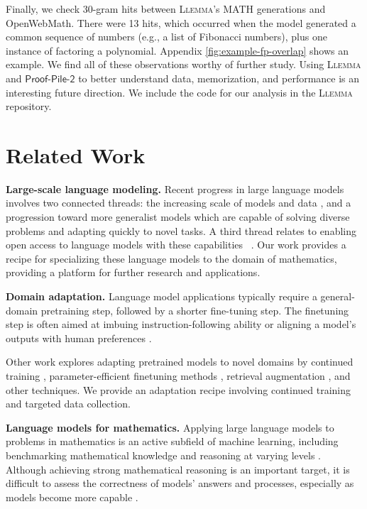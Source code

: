Finally, we check 30-gram hits between \textsc{Llemma}'s MATH generations and OpenWebMath. There were 13 hits, which occurred when the model generated a common sequence of numbers (e.g., a list of Fibonacci numbers), plus one instance of factoring a polynomial. Appendix \autoref{fig:example-fp-overlap} shows an example. We find all of these observations worthy of further study. Using \textsc{Llemma} and $\mathsf{Proof}$-$\mathsf{Pile}$-$\mathsf{2}$ to better understand data, memorization, and performance is an interesting future direction. We include the code for our analysis in the \textsc{Llemma} repository.

\section{Related Work}

\textbf{Large-scale language modeling.} Recent progress in large language models involves two connected threads: the increasing scale of models and data \citep{hoffmann2022training, kaplan2020ScalingLF, chowdhery2022palm}, and a progression toward more generalist models \citep{radford2019language, brown2020gpt3} which are capable of solving diverse problems and adapting quickly to novel tasks. A third thread relates to enabling open access to language models with these capabilities ~\citep{black2022gpt,biderman2023pythia,touvron2023llama,roziere2023code}. Our work provides a recipe for specializing these language models to the domain of mathematics, providing a platform for further research and applications.

\textbf{Domain adaptation.} Language model applications typically require a general-domain pretraining step, followed by a shorter fine-tuning step. The finetuning step is often aimed at imbuing instruction-following ability \citep{sanh2022multitask, wei2022finetuned} or aligning a model's outputs with human preferences \citep{ziegler2019fine,ouyang2022training, bai2022training}.

Other work explores adapting pretrained models to novel domains by continued training \citep{roziere2023code, beltagy-etal-2019-scibert}, parameter-efficient finetuning methods \citep{yong-etal-2023-bloom}, retrieval augmentation \citep{min2023silo,asai-etal-2023-retrieval}, and other techniques. We provide an adaptation recipe involving continued training and targeted data collection.

\textbf{Language models for mathematics.} Applying large language models to problems in mathematics is an active subfield of machine learning, including benchmarking mathematical knowledge and reasoning at varying levels \citep{hendrycksmath2021, zheng2021minif2f,welleck2022naturalprover,azerbayev2023ProofNet}. Although achieving strong mathematical reasoning is an important target, it is difficult to assess the correctness of models' answers and processes, especially as models become more capable \citep{bowman2022measuring, uesato2022solving, lightman2023lets, cobbe2021gsm8k}.

